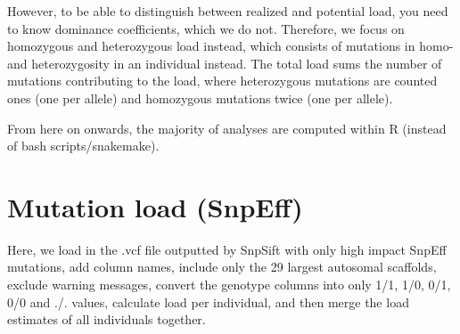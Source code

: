 \documentclass[
  letterpaper,
  DIV=11,
  numbers=noendperiod]{scrreprt}
\begin{document}
However, to be able to distinguish between realized and potential load,
you need to know dominance coefficients, which we do not. Therefore, we
focus on homozygous and heterozygous load instead, which consists of
mutations in homo- and heterozygosity in an individual instead. The
total load sums the number of mutations contributing to the load, where
heterozygous mutations are counted ones (one per allele) and homozygous
mutations twice (one per allele).

From here on onwards, the majority of analyses are computed within R
(instead of bash scripts/snakemake).

\hypertarget{mutation-load-snpeff}{%
\section{Mutation load (SnpEff)}\label{mutation-load-snpeff}}

Here, we load in the .vcf file outputted by SnpSift with only high
impact SnpEff mutations, add column names, include only the 29 largest
autosomal scaffolds, exclude warning messages, convert the genotype
columns into only 1/1, 1/0, 0/1, 0/0 and ./. values, calculate load per
individual, and then merge the load estimates of all individuals
together.
\end{document}
